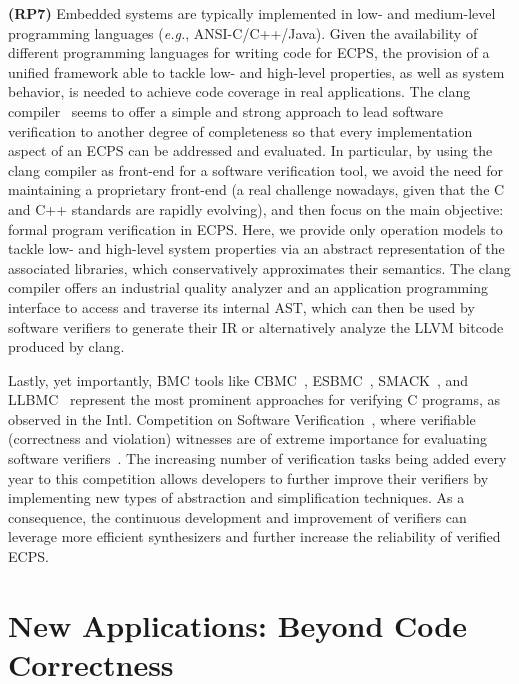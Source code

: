 \documentclass[format=acmsmall, review=false, screen=true]{acmart}
\begin{document}
{{\textbf{(RP7)} Embedded systems are typically implemented in low- and medium-level programming languages ({\it e.g.}, ANSI-C/C++/Java). Given the availability of different programming languages for writing code for ECPS, the provision of a unified framework able to tackle low- and high-level properties, as well as system behavior, is needed to achieve code coverage in real applications. The clang compiler~\cite{Lopes:2014:GSL:2692607} seems to offer a simple and strong approach to lead software verification to another degree of completeness so that every implementation aspect of an ECPS can be addressed and evaluated. In particular, by using the clang compiler as front-end for a software verification tool, we avoid the need for maintaining a proprietary front-end (a real challenge nowadays, given that the C and C++ standards are rapidly evolving), and then focus on the main objective: formal program verification in ECPS. Here, we provide only operation models to tackle low- and high-level system properties via an abstract representation of the associated libraries, which conservatively approximates their semantics. The clang compiler offers an industrial quality analyzer and an application programming interface to access and traverse its internal AST, which can then be used by software verifiers to generate their IR or alternatively analyze the LLVM bitcode produced by clang. 

Lastly, yet importantly, BMC tools like CBMC~\cite{Clarke04}, ESBMC~\cite{MorseCNF13,MorseRCN014}, SMACK~\cite{Haran15}, and LLBMC~\cite{MerzFS12} represent the most prominent approaches for verifying C programs, as observed in the Intl. Competition on Software Verification~\cite{Beyer14,BeyerSVCOMP15,Beyer16}, where verifiable (correctness and violation) witnesses are of extreme importance for evaluating software verifiers~\cite{BeyerW15,RochaIFM12}. The increasing number of verification tasks being added every year to this competition allows developers to further improve their verifiers by implementing new types of abstraction and simplification techniques. As a consequence, the continuous development and improvement of verifiers can leverage more efficient synthesizers and further increase the reliability of verified ECPS.

\section{New Applications: Beyond Code Correctness}
\label{Newapp}

}}
\end{document}
